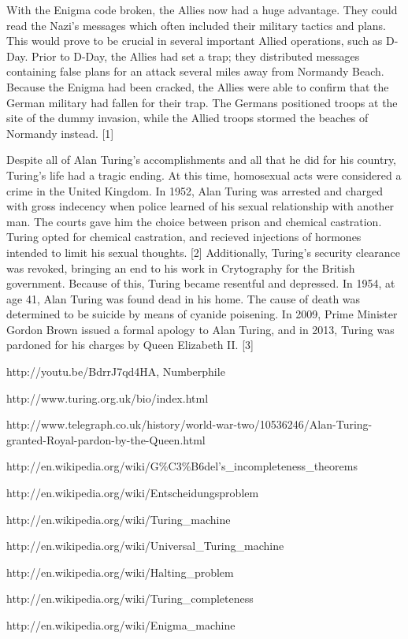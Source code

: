 \documentclass[12pt]{article}
\theoremstyle{mystyle}
\begin{document}
With the Enigma code broken, the Allies now had a huge advantage. They could
read the Nazi's messages which often included their military tactics and plans.
This would prove to be crucial in several important Allied operations, such as
D-Day. Prior to D-Day, the Allies had set a trap; they distributed messages
containing false plans for an attack several miles away from Normandy Beach. Because the
Enigma had been cracked, the Allies were able to confirm that the German
military  had fallen for their trap. The Germans positioned troops at the site
of the dummy invasion, while the Allied troops stormed the beaches of Normandy
instead. [1]


Despite all of Alan Turing's accomplishments and all that he did for his
country, Turing's life had a tragic ending. At this time, homosexual acts were
considered a crime in the United Kingdom. In 1952, Alan Turing was arrested and
charged with gross indecency when police learned of his sexual relationship
with another man. The courts gave him the choice between prison and chemical
castration. Turing opted for chemical castration, and recieved injections of
hormones intended to limit his sexual thoughts. [2] Additionally, Turing's
security clearance was revoked, bringing an end to his work in Crytography for the
British government. Because of this, Turing became resentful and depressed. In
1954, at age 41, Alan Turing was found dead in his home. The cause of death was
determined to be suicide by means of cyanide poisening. In 2009, Prime Minister
Gordon Brown issued a formal apology to Alan Turing, and in 2013, Turing was 
pardoned for his charges by Queen Elizabeth II. [3]


\begin{thebibliography}{20}

http://youtu.be/BdrrJ7qd4HA,
Numberphile

\bibitem{}
http://www.turing.org.uk/bio/index.html

\bibitem{}
http://www.telegraph.co.uk/history/world-war-two/10536246/Alan-Turing-granted-Royal-pardon-by-the-Queen.html

http://en.wikipedia.org/wiki/G\%C3\%B6del's\_incompleteness\_theorems

http://en.wikipedia.org/wiki/Entscheidungsproblem

\bibitem{}
http://en.wikipedia.org/wiki/Turing\_machine

\bibitem{}
http://en.wikipedia.org/wiki/Universal\_Turing\_machine

\bibitem{}
http://en.wikipedia.org/wiki/Halting\_problem

\bibitem{}
http://en.wikipedia.org/wiki/Turing\_completeness

\bibitem{}
http://en.wikipedia.org/wiki/Enigma\_machine


\end{thebibliography}
\end{document}
